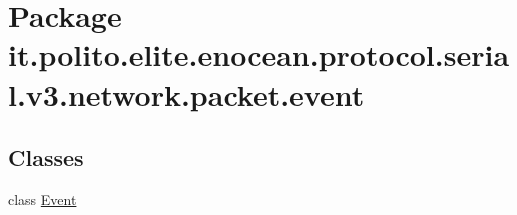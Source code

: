 \hypertarget{namespaceit_1_1polito_1_1elite_1_1enocean_1_1protocol_1_1serial_1_1v3_1_1network_1_1packet_1_1event}{}\section{Package it.\+polito.\+elite.\+enocean.\+protocol.\+serial.\+v3.\+network.\+packet.\+event}
\label{namespaceit_1_1polito_1_1elite_1_1enocean_1_1protocol_1_1serial_1_1v3_1_1network_1_1packet_1_1event}
\subsection*{Classes}
\begin{DoxyCompactItemize}
\item 
class \hyperlink{classit_1_1polito_1_1elite_1_1enocean_1_1protocol_1_1serial_1_1v3_1_1network_1_1packet_1_1event_1_1_event}{Event}
\end{DoxyCompactItemize}
